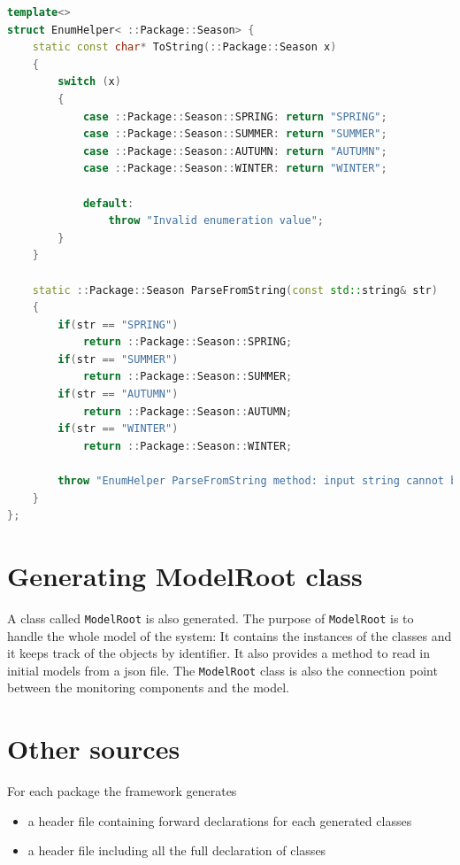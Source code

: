 \begin{minipage}{\textwidth}
\begin{lstlisting}[language=C++]
template<>
struct EnumHelper< ::Package::Season> {
	static const char* ToString(::Package::Season x)
	{
		switch (x)
		{
			case ::Package::Season::SPRING: return "SPRING";
			case ::Package::Season::SUMMER: return "SUMMER";
			case ::Package::Season::AUTUMN: return "AUTUMN";
			case ::Package::Season::WINTER: return "WINTER";
			
			default:
				throw "Invalid enumeration value";
		}
	}
	
	static ::Package::Season ParseFromString(const std::string& str)
	{
		if(str == "SPRING")
			return ::Package::Season::SPRING;
		if(str == "SUMMER")
			return ::Package::Season::SUMMER;
		if(str == "AUTUMN")
			return ::Package::Season::AUTUMN;
		if(str == "WINTER")
			return ::Package::Season::WINTER;
		
		throw "EnumHelper ParseFromString method: input string cannot be interpreted.";
	}
};
\end{lstlisting}
\end{minipage}


\section{ Generating ModelRoot class }

A class called \texttt{ModelRoot} is also generated.
The purpose of \texttt{ModelRoot} is to handle the whole model of the system: 
It contains the instances of the classes and it keeps track of the objects by identifier.
It also provides a method to read in initial models from a json file.
The \texttt{ModelRoot} class is also the connection point between the monitoring components and the model.

\section{ Other sources }

For each package the framework generates
\begin{itemize}
	\item a header file containing forward declarations for each generated classes
	\item a header file including all the full declaration of classes
\end{itemize} 

